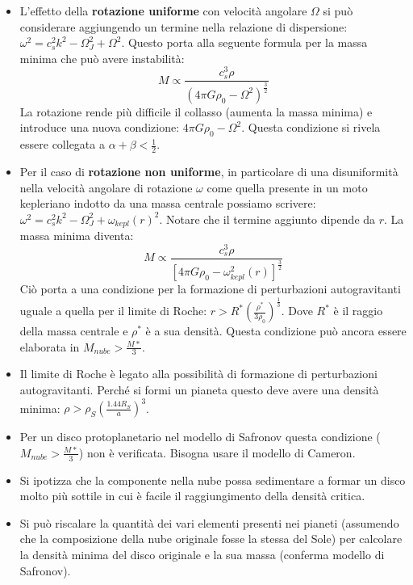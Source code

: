 \documentclass[11pt,a4paper]{article}
\begin{document}
\begin{itemize}
\item L'effetto della \textbf{rotazione uniforme} con velocità angolare $\Omega$ si può considerare aggiungendo un termine nella relazione di dispersione: $\omega^2 = c_s^2 k^2 - \Omega_{J}^2+\Omega^2$. Questo porta alla seguente formula per la massa minima che può avere instabilità: 
\begin{equation}
M \propto \frac{c_s^3 \rho}{\left( 4 \pi G \rho_0 - \Omega^2 \right) ^ {\frac{3}{2}}}
\end{equation}
La rotazione rende più difficile il collasso (aumenta la massa minima) e introduce una nuova condizione: $ 4 \pi G \rho_0 - \Omega^2$. Questa condizione si rivela essere collegata a $\alpha + \beta < \frac{1}{2}$.

\item Per il caso di \textbf{rotazione non uniforme}, in particolare di una disuniformità nella velocità angolare di rotazione $\omega$ come quella presente in un moto kepleriano indotto da una massa centrale possiamo scrivere: $\omega^2 = c_s^2 k^2 - \Omega_J^2+\omega_{kepl}(r)^2$. Notare che il termine aggiunto dipende da $r$. La massa minima diventa:
\begin{equation}
M \propto \frac{c_s^3 \rho}{\left[ 4 \pi G \rho_0 - \omega_{kepl}^{2}(r) \right]^ {\frac{3}{2}}}
\end{equation}
Ciò porta a una condizione per la formazione di perturbazioni autogravitanti uguale a quella per il limite di Roche: $r > R^{*} \left( \frac{\rho^{*}}{3 \rho_0} \right) ^ {\frac{1}{3}}$. Dove $R^{*}$ è il raggio della massa centrale e $\rho^{*}$ è a sua densità. Questa condizione può ancora essere elaborata in $M_{nube} > \frac{M*}{3}$.

\item Il limite di Roche è legato alla possibilità di formazione di perturbazioni autogravitanti. Perché si formi un pianeta questo deve avere una densità minima: $\rho > \rho_{S} \left( \frac{1.44 R_S}{a} \right)^3$. 

\item Per un disco protoplanetario nel modello di Safronov questa condizione ($M_{nube} > \frac{M*}{3}$) non è verificata. Bisogna usare il modello di Cameron.

\item Si ipotizza che la componente nella nube possa sedimentare a formar un disco molto più sottile in cui è facile il raggiungimento della densità critica.

\item Si può riscalare la quantità dei vari elementi presenti nei pianeti (assumendo che la composizione della nube originale fosse la stessa del Sole) per calcolare la densità minima del disco originale e la sua massa (conferma modello di Safronov).


\end{itemize}
\end{document}
